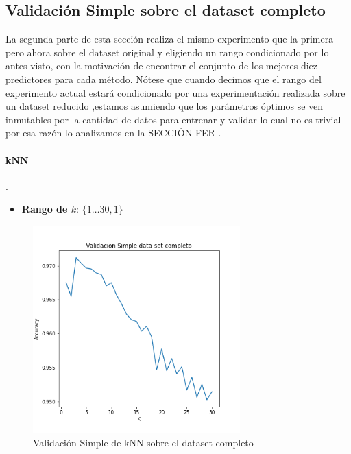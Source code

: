 \subsection{Validación Simple sobre el dataset completo}

La segunda parte de esta sección realiza el mismo experimento que la primera pero ahora sobre el dataset original y eligiendo un rango condicionado por lo antes visto, con la motivación de encontrar el conjunto de los mejores diez predictores para cada método. Nótese que cuando decimos que el rango del experimento actual estará condicionado por una experimentación realizada sobre un dataset reducido ,estamos asumiendo que los parámetros óptimos se ven inmutables por la cantidad de datos para entrenar y validar lo cual no es trivial por esa razón lo analizamos en la SECCIÓN FER .


\paragraph{kNN}
.
\begin{itemize}

    \item \textbf{Rango de $k$}: $\{1\dots30, 1\}$


\end{itemize}

\begin{figure}[H]
    \centering
    \includegraphics[width=8cm]{images/validacionSimple_datasetCompleto.png}%
    \qquad
    \caption{Validación Simple de kNN sobre el dataset completo}
    \label{knn_valSimple}%
\end{figure}

